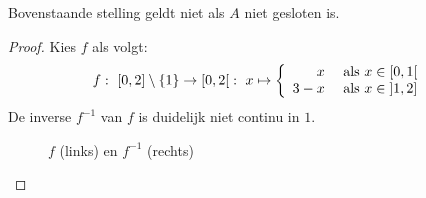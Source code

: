 \documentclass[main.tex]{subfiles}
\begin{document}
\begin{tvb}
  Bovenstaande stelling geldt niet als $A$ niet gesloten is.

  \begin{proof}
    Kies $f$ als volgt:
    \[
    f:\ \interval{0}{2} \setminus \{1\} \rightarrow \interval[open right]{0}{2}:\
    x \mapsto
    \left\{
      \begin{array}{rl}
        x & \text{ als } x \in \interval[open right]{0}{1}\\
        3-x & \text{ als } x \in \interval[open left]{1}{2}\\
      \end{array}
    \right.
    \]
    De inverse $f^{-1}$ van $f$ is duidelijk niet continu in $1$.
    \begin{figure}[H]
      \begin{center}
      \end{center}
      \caption{ $f$ (links) en $f^{-1}$ (rechts)}
    \end{figure}
  \end{proof}
\end{tvb}
\end{document}
